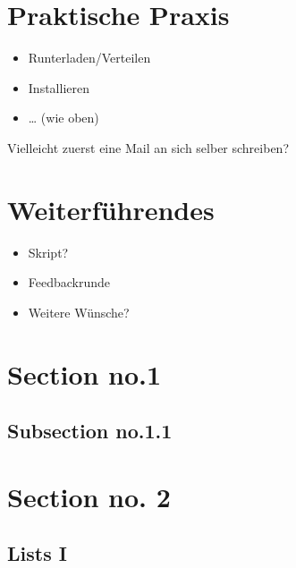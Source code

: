 \documentclass[compress]{beamer}
\begin{document}
\section{Praktische Praxis}
\label{sec-1-1-6}

\begin{itemize}
\item Runterladen/Verteilen
\item Installieren
\item \ldots{} (wie oben)
\end{itemize}

Vielleicht zuerst eine Mail an sich selber schreiben?
\section{Weiterführendes}
\label{sec-1-1-7}

\begin{itemize}
\item Skript?
\item Feedbackrunde
\item Weitere Wünsche?
\end{itemize}

\section{Section no.1} 
\subsection{Subsection no.1.1  }


\section{Section no. 2} 
\subsection{Lists I}

\end{document}
